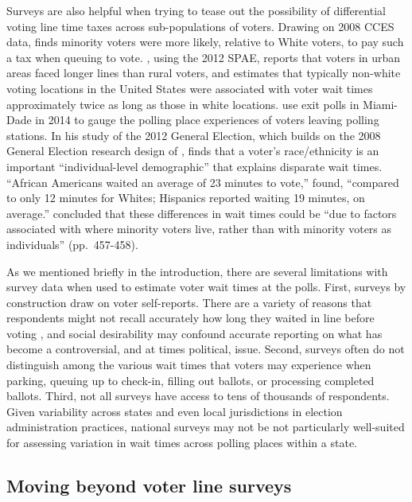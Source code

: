 \documentclass[12pt,titlepage]{article}
\begin{document}
Surveys are also helpful when trying to tease out the possibility of
differential voting line time taxes across sub-populations of voters.
Drawing on 2008 CCES data, \cite{mukherjee:timetax} finds minority
voters were more likely, relative to White voters, to pay such a tax
when queuing to vote. \citet{kimball:voting}, using the 2012 SPAE,
reports that voters in urban areas faced longer lines than rural
voters, and \citet{pettigrew:racegapwaittimes} estimates that
typically non-white voting locations in the United States were
associated with voter wait times approximately twice as long as those
in white locations.  \cite{herron:confidence} use exit polls in
Miami-Dade in 2014 to gauge the polling place experiences of voters
leaving polling stations.  In his study of the 2012 General Election,
which builds on the 2008 General Election research design of
\citet{alvarez:survey}, \cite{stewart:waitingtovote2012} finds that a
voter's race/ethnicity is an important ``individual-level
demographic'' that explains disparate wait times.  ``African Americans
waited an average of 23 minutes to vote,''
\citeauthor{stewart:waitingtovote2012} found, ``compared to only 12
minutes for Whites; Hispanics reported waiting 19 minutes, on
average.''  \citeauthor{stewart:waitingtovote2012} concluded that
these differences in wait times could be ``due to factors associated
with where minority voters live, rather than with minority voters as
individuals'' (pp.\ 457-458).

As we mentioned briefly in the introduction, there are several
limitations with survey data when used to estimate voter wait times at
the polls. First, surveys by construction draw on voter self-reports.
There are a variety of reasons that respondents might not recall
accurately how long they waited in line before voting
\citep[e.g.,][]{sackettetal:timeflies}, and social desirability may
confound accurate reporting on what has become a controversial, and at
times political, issue.  Second, surveys often do not distinguish
among the various wait times that voters may experience when parking,
queuing up to check-in, filling out ballots, or processing completed
ballots. Third, not all surveys have access to tens of thousands of
respondents.  Given variability across states and even local
jurisdictions in election administration practices, national surveys
may not be not particularly well-suited for assessing variation in
wait times across polling places within a state.

\subsection*{Moving beyond voter line surveys}
\end{document}

